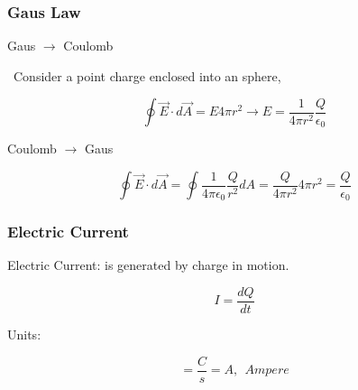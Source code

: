 \documentclass[]{beamer}
\begin{document}
\begin{frame}
\frametitle{Gaus Law}

Gaus $\rightarrow$ Coulomb
\vspace{3mm}
\pause

\
Consider a point charge enclosed into an sphere,
\vspace{3mm}
\pause

\begin{equation}
\oint \vec{E}\cdot d\vec{A}=E4\pi r^2\rightarrow E=\frac{1}{4\pi r^2}\frac{Q}{\epsilon_0}
\end{equation}

\pause
\vspace{3mm}

Coulomb $\rightarrow$ Gaus
\vspace{3mm}

\pause

\begin{equation}
\oint \vec{E}\cdot d\vec{A}=\oint \frac{1}{4\pi \epsilon_0} \frac{Q}{r^2}dA=\frac{Q}{4\pi r^2}4\pi r^2=\frac{Q}{\epsilon_0}
\end{equation}

  \end{frame}







\begin{frame}
\frametitle{Electric Current}

Electric Current: is generated by charge in motion.
\pause

\begin{equation}
I=\frac{dQ}{dt}
\end{equation}
\pause

\vspace{3mm}

Units:

\begin{equation*}
[I]=\frac{C}{s}= A,\ \ Ampere
\end{equation*}


  \end{frame}



\end{document}
